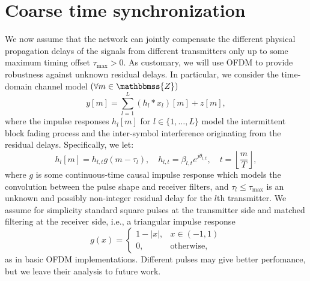 \documentclass[10pt,journal,a4paper]{IEEEtran}
\newcommand{\stdset}[1]{\mathbbmss{#1}}	%
\begin{document}
\section{Coarse time synchronization}
\label{sec:time}
We now assume that the network can jointly compensate the different physical propagation delays
of the signals from different transmitters only up to some maximum timing offset $\tau_{\max}>0$. As customary, we will use OFDM to provide robustness against unknown residual delays. In particular, we consider the time-domain channel model $(\forall m \in \stdset{Z})$
\begin{equation*}
y[m] = \sum_{l=1}^L(h_l * x_l)[m]+z[m],
\end{equation*}
where the impulse responses $h_l[m]$ for $l\in \{1,\ldots,L\}$ model the intermittent block fading process and the inter-symbol interference originating from the residual delays. Specifically, we let:
\begin{equation*}
h_l[m] = h_{l,t}g(m-\tau_l), \quad h_{l,t} = \beta_{l,t}e^{j\theta_{l,t}}, \quad t = \left\lfloor\frac{m}{T}\right\rfloor,
\end{equation*}
where $g$ is some continuous-time causal impulse response which models the convolution between the pulse shape and receiver filters, and $\tau_l \leq \tau_{\max}$ is an unknown and possibly non-integer residual delay for the $l$th transmitter. We assume for simplicity standard square pulses at the transmitter side and matched filtering at the receiver side, i.e., a triangular impulse response
\begin{equation*}
g(x)= \begin{cases}
1-|x|, & x\in (-1,1) \\
0, & \text{otherwise},
\end{cases}
\end{equation*}
as in basic OFDM implementations. Different pulses may give better perfomance, but we leave their analysis to future work.  

\end{document}
